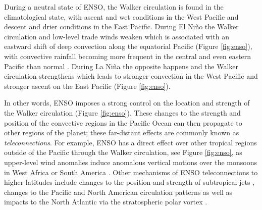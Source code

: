 During a neutral state of ENSO, the Walker circulation is found in the climatological state, with ascent and wet conditions in the West Pacific  and descent and drier conditions in the East Pacific. During El Niño the Walker circulation and low-level trade winds weaken which is associated with an eastward shift of deep convection along the equatorial Pacific (Figure \ref{fig:enso}), with convective rainfall becoming more frequent in the central and even eastern Pacific than normal \citep{neelin1998,wang2004}. During La Niña the opposite happens and the Walker circulation strengthens which leads to stronger convection in the West Pacific and stronger ascent on the East Pacific (Figure \ref{fig:enso}). 


In other words, ENSO imposes a strong control on the location and strength of the Walker circulation (Figure \ref{fig:enso}). These changes to the strength and position of the convective regions in the Pacific Ocean can then propagate to other regions of the planet; these far-distant effects are commonly known as \textit{teleconnections}.  
For example, ENSO has a direct effect over other tropical regions outside of the Pacific through the Walker circulation, see Figure \ref{fig:enso}, as upper-level wind anomalies induce anomalous vertical motions over the monsoons in West Africa \citep{ropelewski1986,ropelewski1987} or South America \citep{sulca2018}.  
  Other mechanisms of ENSO teleconnections to higher latitudes include changes to the position and strength of subtropical jets \citep{fereday2020}, changes to the Pacific and North American circulation patterns \citep{bayr2019} as well as impacts to the North Atlantic via the stratospheric polar vortex \citep{domeisen2019}.
  
 
  
